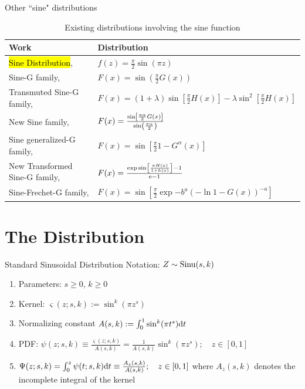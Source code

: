 \documentclass{beamer}
\begin{document}
\begin{frame}{Other ``sine" distributions}
    \begin{table}[h]
        \centering
        \begin{tabularx}{\textwidth}{X|X}
            \bfseries Work & \bfseries Distribution \\
            \hline
            \hl{Sine Distribution}, \cite{gilbert1893moon} & $f(z) = \frac{\pi}{2} \sin(\pi z)$ \\
            Sine-G family, \cite{kumar2015bladder} & $F(x) = \sin \left(\frac{\pi}{2} G(x) \right)$ \\
            Transmuted Sine-G family, \cite{sakthivel2021transmuted} & $F(x) = (1+\lambda)\sin \left[\frac{\pi}{2} H(x)\right] - \lambda \sin^2 \left[\frac{\pi}{2}H(x)\right]$\\
            New Sine family, \cite{benchiha2023newsineg} & $F(x) = \frac{\sin \left[\frac{\pi \alpha}{2} G(x)\right]}{\sin \left( \frac{\pi \alpha}{2} \right)}$ \\
            Sine generalized-G family, \cite{oramulu2024sinegen} & $F(x) = \sin \left[\frac{\pi}{2} {1-G^\alpha(x)}\right]$\\
            New Transformed Sine-G family, \cite{osi2025ntsg} & $F(x) = \frac{\exp \sin \left[ \frac{\pi H(x)}{1+h(x)} \right] - 1}{\mathrm e - 1}$\\
            Sine-Frechet-G family, \cite{jerry2026frechet} & $F(x) = \sin \left[\frac \pi 2 \exp{-b^a (-\ln{1-G(x)})^{-a}}\right]$
        \end{tabularx}
        \caption{Existing distributions involving the sine function}
        \label{tab:othersines}
    \end{table}
\end{frame}

\section{The Distribution}
\begin{frame}{Standard Sinusoidal Distribution}
Notation: $Z \sim \operatorname*{Sinu}(s,k)$
\begin{enumerate}
    \item Parameters: $s \ge 0$, $k\ge 0$
    \item Kernel: $\varsigma(z; s,k) := \sin^k(\pi z^s)$
    \item Normalizing constant $A(s,k) := \int_0^1 \sin^k(\pi t^s) \mathrm d t$
    \item PDF: $\psi(z; s,k) \equiv \frac{\varsigma(z; s,k)}{A(s,k)} = \frac{1}{A(s,k)} \sin^k(\pi z^s); \quad z \in [0,1]$
    \item $\Psi(z; s,k) = \int_0^z \psi(t; s,k) \mathrm d t \equiv \frac{A_z(s,k)}{A(s,k)}; \quad z\in[0,1]$ where $A_z(s,k)$ denotes the incomplete integral of the kernel
    
\end{enumerate}
\end{frame}
\end{document}
